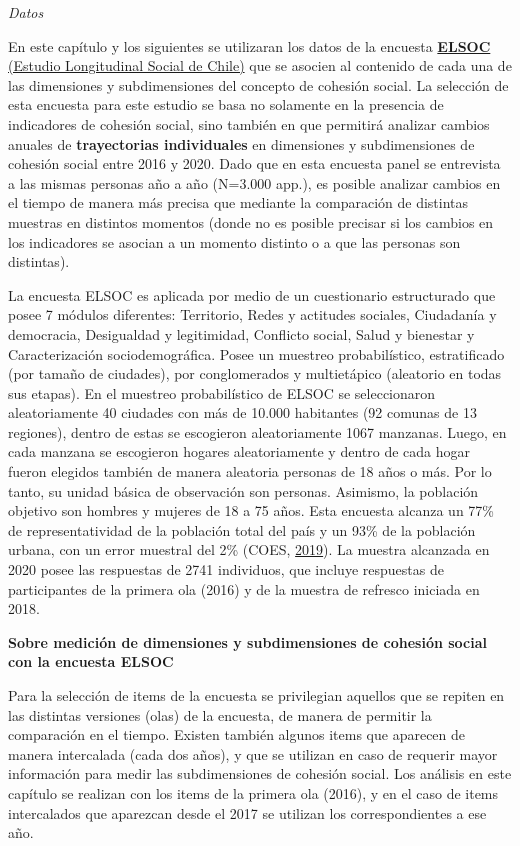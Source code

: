 \documentclass[
  12pt,
]{book}
\begin{document}
\emph{Datos}

En este capítulo y los siguientes se utilizaran los datos de la encuesta \href{https://coes.cl/encuesta-panel/}{\textbf{ELSOC} (Estudio Longitudinal Social de Chile)} que se asocien al contenido de cada una de las dimensiones y subdimensiones del concepto de cohesión social. La selección de esta encuesta para este estudio se basa no solamente en la presencia de indicadores de cohesión social, sino también en que permitirá analizar cambios anuales de \textbf{trayectorias individuales} en dimensiones y subdimensiones de cohesión social entre 2016 y 2020. Dado que en esta encuesta panel se entrevista a las mismas personas año a año (N=3.000 app.), es posible analizar cambios en el tiempo de manera más precisa que mediante la comparación de distintas muestras en distintos momentos (donde no es posible precisar si los cambios en los indicadores se asocian a un momento distinto o a que las personas son distintas).

La encuesta ELSOC es aplicada por medio de un cuestionario estructurado que posee 7 módulos diferentes: Territorio, Redes y actitudes sociales, Ciudadanía y democracia, Desigualdad y legitimidad, Conflicto social, Salud y bienestar y Caracterización sociodemográfica. Posee un muestreo probabilístico, estratificado (por tamaño de ciudades), por conglomerados y multietápico (aleatorio en todas sus etapas). En el muestreo probabilístico de ELSOC se seleccionaron aleatoriamente 40 ciudades con más de 10.000 habitantes (92 comunas de 13 regiones), dentro de estas se escogieron aleatoriamente 1067 manzanas. Luego, en cada manzana se escogieron hogares aleatoriamente y dentro de cada hogar fueron elegidos también de manera aleatoria personas de 18 años o más. Por lo tanto, su unidad básica de observación son personas. Asimismo, la población objetivo son hombres y mujeres de 18 a 75 años. Esta encuesta alcanza un 77\% de representatividad de la población total del país y un 93\% de la población urbana, con un error muestral del 2\% (COES, \protect\hyperlink{ref-coes_radiografia_2019}{2019}). La muestra alcanzada en 2020 posee las respuestas de 2741 individuos, que incluye respuestas de participantes de la primera ola (2016) y de la muestra de refresco iniciada en 2018.

\textbf{Sobre medición de dimensiones y subdimensiones de cohesión social con la encuesta ELSOC}

Para la selección de items de la encuesta se privilegian aquellos que se repiten en las distintas versiones (olas) de la encuesta, de manera de permitir la comparación en el tiempo. Existen también algunos items que aparecen de manera intercalada (cada dos años), y que se utilizan en caso de requerir mayor información para medir las subdimensiones de cohesión social. Los análisis en este capítulo se realizan con los items de la primera ola (2016), y en el caso de items intercalados que aparezcan desde el 2017 se utilizan los correspondientes a ese año.
\end{document}
